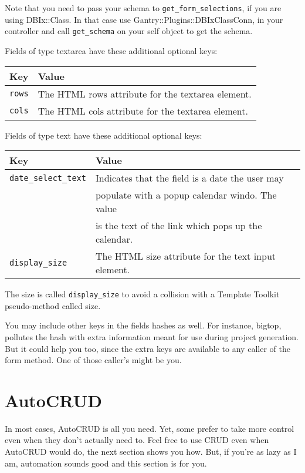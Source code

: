 Note that you need to pass your schema to \verb+get_form_selections+,
if you are using DBIx::Class.  In that case use Gantry::Plugins::DBIxClassConn,
in your controller and call \verb+get_schema+ on your self object to get
the schema.

Fields of type textarea have these additional optional keys:

\begin{tabular}{l|l}
Key & Value\\
\hline
\verb+rows+ & The HTML rows attribute for the textarea element. \\
\verb+cols+ & The HTML cols attribute for the textarea element. \\
\end{tabular}

Fields of type text have these additional optional keys:

\begin{tabular}{l|l}
Key & Value\\
\hline
\verb+date_select_text+ & Indicates that the field is a date the user may\\
                        & populate with a popup calendar windo. The value \\
                        & is the text of the link which pops up the calendar.\\
\verb+display_size+ & The HTML size attribute for the text input element. \\
\end{tabular}

The size is called \verb+display_size+ to avoid a collision with a
Template Toolkit pseudo-method called size.

You may include other keys in the fields hashes as well.  For instance,
bigtop, pollutes the hash with extra information meant for use during
project generation.  But it could help you too, since the extra keys
are available to any caller of the form method.  One of those caller's
might be you.

\section{AutoCRUD}

In most cases, AutoCRUD is all you need.  Yet, some prefer to take more
control even when they don't actually need to.  Feel free to use CRUD even
when AutoCRUD would do, the next section shows you how.  But, if you're as
lazy as I am, automation sounds good and this section is for you.

